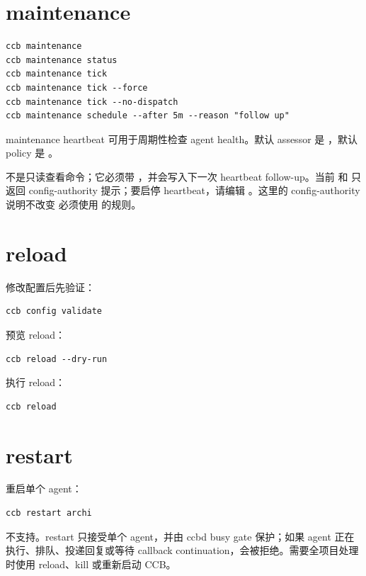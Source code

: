 \section{maintenance}

\begin{lstlisting}
ccb maintenance
ccb maintenance status
ccb maintenance tick
ccb maintenance tick --force
ccb maintenance tick --no-dispatch
ccb maintenance schedule --after 5m --reason "follow up"
\end{lstlisting}

maintenance heartbeat 可用于周期性检查 agent health。默认 assessor 是 ，默认 policy 是 。

 不是只读查看命令；它必须带 ，并会写入下一次 heartbeat follow-up。当前  和  只返回 config-authority 提示；要启停 heartbeat，请编辑 。这里的 config-authority 说明不改变  必须使用  的规则。

\section{reload}

修改配置后先验证：

\begin{lstlisting}
ccb config validate
\end{lstlisting}

预览 reload：

\begin{lstlisting}
ccb reload --dry-run
\end{lstlisting}

执行 reload：

\begin{lstlisting}
ccb reload
\end{lstlisting}

\section{restart}

重启单个 agent：

\begin{lstlisting}
ccb restart archi
\end{lstlisting}

 不支持。restart 只接受单个 agent，并由 ccbd busy gate 保护；如果 agent 正在执行、排队、投递回复或等待 callback continuation，会被拒绝。需要全项目处理时使用 reload、kill 或重新启动 CCB。

